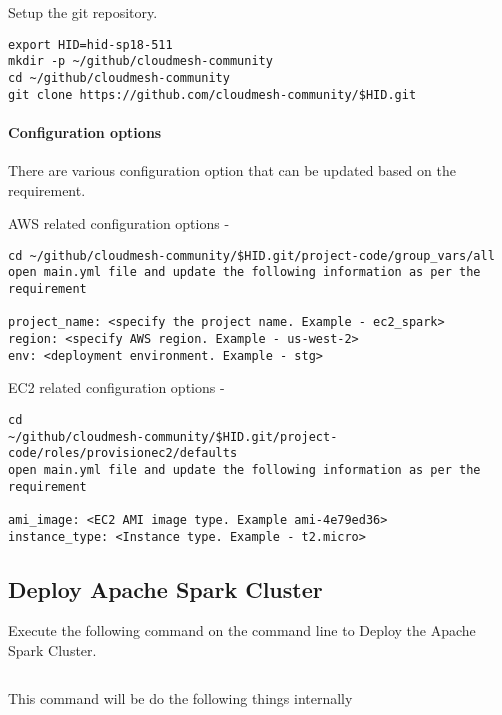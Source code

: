 Setup the git repository.

\begin{verbatim}
export HID=hid-sp18-511
mkdir -p ~/github/cloudmesh-community
cd ~/github/cloudmesh-community
git clone https://github.com/cloudmesh-community/$HID.git
\end{verbatim}


\paragraph{Configuration options}

There are various configuration option that can be updated based on the requirement.

AWS related configuration options -

\begin{verbatim}
cd ~/github/cloudmesh-community/$HID.git/project-code/group_vars/all
open main.yml file and update the following information as per the requirement

project_name: <specify the project name. Example - ec2_spark>
region: <specify AWS region. Example - us-west-2>
env: <deployment environment. Example - stg>
\end{verbatim}

EC2 related configuration options -

\begin{verbatim}
cd
~/github/cloudmesh-community/$HID.git/project-code/roles/provisionec2/defaults
open main.yml file and update the following information as per the requirement
 
ami_image: <EC2 AMI image type. Example ami-4e79ed36>
instance_type: <Instance type. Example - t2.micro>
\end{verbatim}

\subsection{Deploy Apache Spark Cluster}

Execute the following command on the command line to Deploy the Apache Spark Cluster.

\begin{verbatim}

\end{verbatim}

This command will be do the following things internally 

